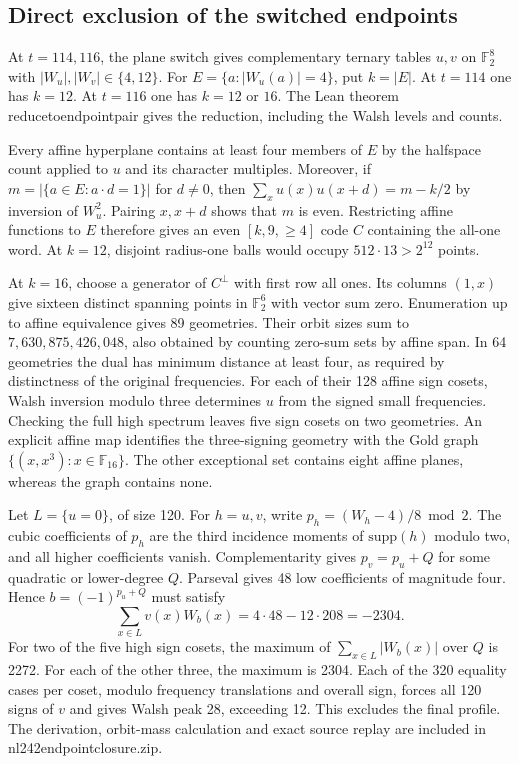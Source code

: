 \documentclass[11pt]{article}
\theoremstyle{definition}
\newcommand{\F}{\mathbb{F}}
\newcommand{\code}[1]{{\ttfamily\small\renewcommand{\_}{\textunderscore\allowbreak}#1}}
\begin{document}
\subsection{Direct exclusion of the switched endpoints}
\label{sec:direct-endpoints}

At $t=114,116$, the plane switch gives complementary ternary tables $u,v$ on $\F_2^8$ with $|W_u|,|W_v|\in\{4,12\}$. For $E=\{a:|W_u(a)|=4\}$, put $k=|E|$. At $t=114$ one has $k=12$. At $t=116$ one has $k=12$ or $16$. The Lean theorem \code{reduce\_to\_endpoint\_pair} gives the reduction, including the Walsh levels and counts.

Every affine hyperplane contains at least four members of $E$ by the halfspace count applied to $u$ and its character multiples. Moreover, if $m=|\{a\in E:a\cdot d=1\}|$ for $d\ne0$, then $\sum_x u(x)u(x+d)=m-k/2$ by inversion of $W_u^2$. Pairing $x,x+d$ shows that $m$ is even. Restricting affine functions to $E$ therefore gives an even $[k,9,\ge4]$ code $C$ containing the all-one word. At $k=12$, disjoint radius-one balls would occupy $512\cdot13>2^{12}$ points.

At $k=16$, choose a generator of $C^\perp$ with first row all ones. Its columns $(1,x)$ give sixteen distinct spanning points in $\F_2^6$ with vector sum zero. Enumeration up to affine equivalence gives 89 geometries. Their orbit sizes sum to $7{,}630{,}875{,}426{,}048$, also obtained by counting zero-sum sets by affine span. In 64 geometries the dual has minimum distance at least four, as required by distinctness of the original frequencies. For each of their 128 affine sign cosets, Walsh inversion modulo three determines $u$ from the signed small frequencies. Checking the full high spectrum leaves five sign cosets on two geometries. An explicit affine map identifies the three-signing geometry with the Gold graph $\{(x,x^3):x\in\F_{16}\}$. The other exceptional set contains eight affine planes, whereas the graph contains none.

Let $L=\{u=0\}$, of size 120. For $h=u,v$, write $p_h=(W_h-4)/8\bmod2$. The cubic coefficients of $p_h$ are the third incidence moments of $\mathrm{supp}(h)$ modulo two, and all higher coefficients vanish. Complementarity gives $p_v=p_u+Q$ for some quadratic or lower-degree $Q$. Parseval gives 48 low coefficients of magnitude four. Hence $b=(-1)^{p_u+Q}$ must satisfy
\[
  \sum_{x\in L} v(x)W_b(x)=4\cdot48-12\cdot208=-2304.
\]
For two of the five high sign cosets, the maximum of $\sum_{x\in L}|W_b(x)|$ over $Q$ is 2272. For each of the other three, the maximum is 2304. Each of the 320 equality cases per coset, modulo frequency translations and overall sign, forces all 120 signs of $v$ and gives Walsh peak 28, exceeding 12. This excludes the final profile. The derivation, orbit-mass calculation and exact source replay are included in \code{nl242\_endpoint\_closure.zip}.
\end{document}
